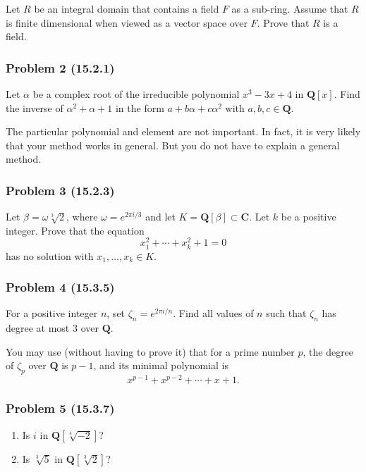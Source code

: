 \documentclass[11pt]{article}
\begin{document}
Let \(R\) be an integral domain that contains a field \(F\) as a sub-ring.
Assume that \(R\) is finite dimensional when viewed as a vector space over \(F\).
Prove that \(R\) is a field.
\subsubsection{Problem 2 (15.2.1)}
\label{sec:org04c6f00}

Let \(\alpha\) be a complex root of the irreducible polynomial \(x^{3}-3x+4\) in \(\mathbf{Q}[x]\).
Find the inverse of \(\alpha^2+\alpha+1\) in the form \(a + b \alpha + c \alpha^{2}\) with \(a, b, c \in \mathbf{Q}\).

The particular polynomial and element are not important.
In fact, it is very likely that your method works in general.
But you do not have to explain a general method.
\subsubsection{Problem 3 (15.2.3)}
\label{sec:org96ae14d}

Let \(\beta = \omega \sqrt[3]{2}\), where \(\omega = e^{2\pi i / 3}\) and let \(K = \mathbf{Q}[\beta] \subset \mathbf{C}\).
Let \(k\) be a positive integer.
Prove that the equation
\[ x_1^2 + \cdots + x_k^2 + 1 = 0\]
has no solution with \(x_1, \dots, x_{k} \in K\).
\subsubsection{Problem 4 (15.3.5)}
\label{sec:orgbd53b5e}
For a positive integer \(n\), set \(\zeta_{n} = e^{2\pi i / n}\).
Find all values of \(n\) such that \(\zeta_{n}\) has degree at most 3 over \(\mathbf{Q}\).

You may use (without having to prove it) that for a prime number \(p\), the degree of \(\zeta_p\) over \(\mathbf{Q}\) is \(p-1\), and its minimal polynomial is
\[x^{p-1}+ x^{p-2} + \cdots + x + 1.\]
\subsubsection{Problem 5 (15.3.7)}
\label{sec:org5011a60}

\begin{enumerate}
\item Is \(i\) in \(\mathbf{Q}[\sqrt[4]{-2}]\)?
\item Is \(\sqrt[3]5\) in \(\mathbf{Q}[\sqrt[3]2]\)?
\end{enumerate}
\end{document}

